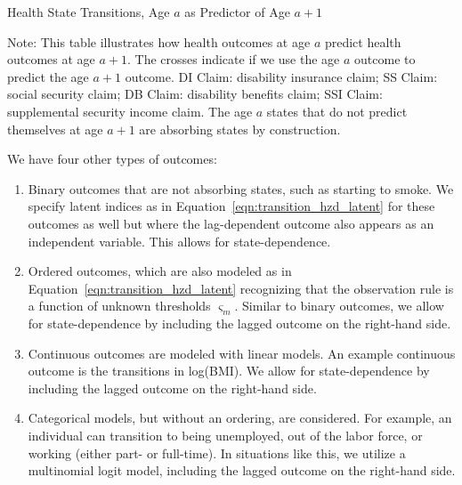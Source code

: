 \begin{table}
\begin{threeparttable}
\caption{Health State Transitions, Age $a$ as Predictor of Age $a+1$}\label{table:transition}
\scriptsize

{\flushleft\footnotesize
Note: This table illustrates how health outcomes at age $a$ predict health outcomes at age $a+1$. The crosses indicate if we use the age $a$ outcome to predict the age $a+1$ outcome. DI Claim: disability insurance claim; SS Claim: social security claim; DB Claim: disability benefits claim; SSI Claim: supplemental security income claim. The age $a$ states that do not predict themselves at age $a+1$ are absorbing states by construction.}
\end{threeparttable}
\end{table}

%


\noindent We have four other types of outcomes: \\
\begin{enumerate}
\item Binary outcomes that are not absorbing states, such as starting to smoke. We specify latent
indices as in Equation~\ref{eqn:transition_hzd_latent} for these outcomes as well but where
the lag-dependent outcome also appears as an independent variable. This allows for state-dependence.

\item Ordered outcomes, which are also modeled as in Equation~\ref{eqn:transition_hzd_latent} recognizing that the observation rule is
a function of unknown thresholds $\varsigma_m$. Similar to binary outcomes, we allow for state-dependence by including the lagged outcome
on the right-hand side.

\item Continuous outcomes are modeled with linear models. An example continuous outcome is the
transitions in log(BMI). We allow for state-dependence by including the lagged outcome on the right-hand side.

\item Categorical models, but without an ordering, are considered. For example, an individual can transition
to being unemployed, out of the labor force, or working (either part- or full-time). In situations like this, we utilize
a multinomial logit model, including the lagged outcome on the right-hand side.

\end{enumerate}


